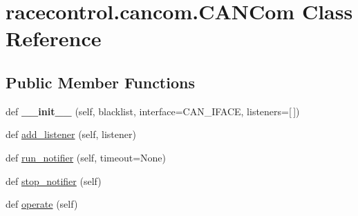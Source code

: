 \hypertarget{classracecontrol_1_1cancom_1_1CANCom}{}\section{racecontrol.\+cancom.\+C\+A\+N\+Com Class Reference}
\label{classracecontrol_1_1cancom_1_1CANCom}
\subsection*{Public Member Functions}
\begin{DoxyCompactItemize}
\item 
def {\bfseries \+\_\+\+\_\+init\+\_\+\+\_\+} (self, blacklist, interface=C\+A\+N\+\_\+\+I\+F\+A\+CE, listeners=\mbox{[}$\,$\mbox{]})\hypertarget{classracecontrol_1_1cancom_1_1CANCom_ab985a1ec22be9cf57bccec3e400a1383}{}\label{classracecontrol_1_1cancom_1_1CANCom_ab985a1ec22be9cf57bccec3e400a1383}

\item 
def \hyperlink{classracecontrol_1_1cancom_1_1CANCom_a17217b9206b06bfb080a34df26bf3e50}{add\+\_\+listener} (self, listener)
\item 
def \hyperlink{classracecontrol_1_1cancom_1_1CANCom_ac7aa4f352f75d0e1581323d2c8fb0d74}{run\+\_\+notifier} (self, timeout=None)
\item 
def \hyperlink{classracecontrol_1_1cancom_1_1CANCom_a6433c22844fea3f3f65f3103528c732c}{stop\+\_\+notifier} (self)
\item 
def \hyperlink{classracecontrol_1_1cancom_1_1CANCom_a909c7508693465607a71003014a14ffc}{operate} (self)
\end{DoxyCompactItemize}
